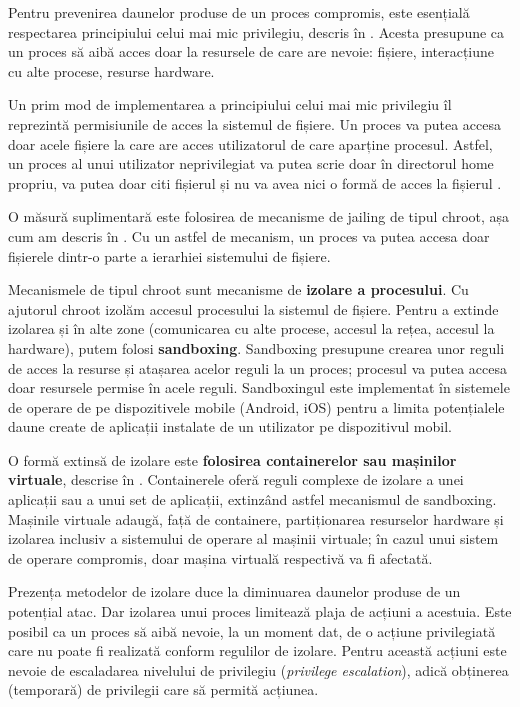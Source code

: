 Pentru prevenirea daunelor produse de un proces compromis, este esențială respectarea principiului celui mai mic privilegiu, descris în .
Acesta presupune ca un proces să aibă acces doar la resursele de care are nevoie: fișiere, interacțiune cu alte procese, resurse hardware.

Un prim mod de implementarea a principiului celui mai mic privilegiu îl reprezintă permisiunile de acces la sistemul de fișiere.
Un proces va putea accesa doar acele fișiere la care are acces utilizatorul de care aparține procesul.
Astfel, un proces al unui utilizator neprivilegiat va putea scrie doar în directorul home propriu, va putea doar citi fișierul  și nu va avea nici o formă de acces la fișierul .

O măsură suplimentară este folosirea de mecanisme de jailing de tipul chroot, așa cum am descris în .
Cu un astfel de mecanism, un proces va putea accesa doar fișierele dintr-o parte a ierarhiei sistemului de fișiere.

Mecanismele de tipul chroot sunt mecanisme de \textbf{izolare a procesului}.
Cu ajutorul chroot izolăm accesul procesului la sistemul de fișiere.
Pentru a extinde izolarea și în alte zone (comunicarea cu alte procese, accesul la rețea, accesul la hardware), putem folosi \textbf{sandboxing}.
Sandboxing presupune crearea unor reguli de acces la resurse și atașarea acelor reguli la un proces;
procesul va putea accesa doar resursele permise în acele reguli.
Sandboxingul este implementat în sistemele de operare de pe dispozitivele mobile (Android, iOS) pentru a limita potențialele daune create de aplicații instalate de un utilizator pe dispozitivul mobil.

O formă extinsă de izolare este \textbf{folosirea containerelor sau mașinilor virtuale}, descrise în .
Containerele oferă reguli complexe de izolare a unei aplicații sau a unui set de aplicații, extinzând astfel mecanismul de sandboxing.
Mașinile virtuale adaugă, față de containere, partiționarea resurselor hardware și izolarea inclusiv a sistemului de operare al mașinii virtuale;
în cazul unui sistem de operare compromis, doar mașina virtuală respectivă va fi afectată.

Prezența metodelor de izolare duce la diminuarea daunelor produse de un potențial atac.
Dar izolarea unui proces limitează plaja de acțiuni a acestuia.
Este posibil ca un proces să aibă nevoie, la un moment dat, de o acțiune privilegiată care nu poate fi realizată conform regulilor de izolare.
Pentru această acțiuni este nevoie de escaladarea nivelului de privilegiu (\textit{privilege escalation}), adică obținerea (temporară) de privilegii care să permită acțiunea.

